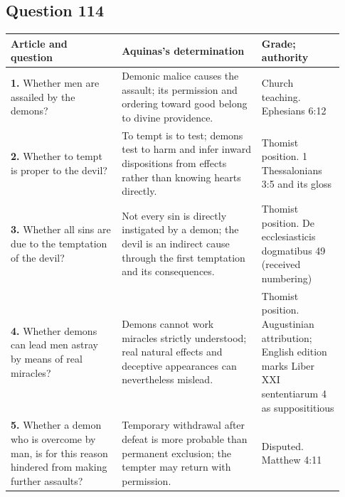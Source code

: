 \subsection{Question 114}
\begin{longtable}{@{}>{\raggedright\arraybackslash}p{0.31\linewidth}>{\raggedright\arraybackslash}p{0.39\linewidth}>{\raggedright\arraybackslash}p{0.23\linewidth}@{}}
\toprule
Article and question & Aquinas's determination & Grade; authority\\
\midrule\endhead
\textbf{1.} Whether men are assailed by the demons? & Demonic malice causes the assault; its permission and ordering toward good belong to divine providence. & Church teaching. Ephesians 6:12\\
\textbf{2.} Whether to tempt is proper to the devil? & To tempt is to test; demons test to harm and infer inward dispositions from effects rather than knowing hearts directly. & Thomist position. 1 Thessalonians 3:5 and its gloss\\
\textbf{3.} Whether all sins are due to the temptation of the devil? & Not every sin is directly instigated by a demon; the devil is an indirect cause through the first temptation and its consequences. & Thomist position. De ecclesiasticis dogmatibus 49 (received numbering)\\
\textbf{4.} Whether demons can lead men astray by means of real miracles? & Demons cannot work miracles strictly understood; real natural effects and deceptive appearances can nevertheless mislead. & Thomist position. Augustinian attribution; English edition marks Liber XXI sententiarum 4 as supposititious\\
\textbf{5.} Whether a demon who is overcome by man, is for this reason hindered from making further assaults? & Temporary withdrawal after defeat is more probable than permanent exclusion; the tempter may return with permission. & Disputed. Matthew 4:11\\
\bottomrule
\end{longtable}

